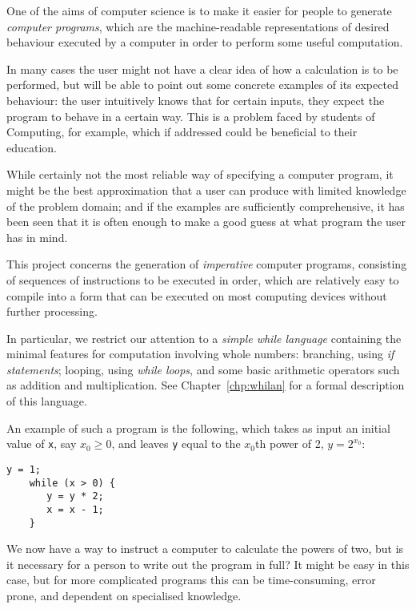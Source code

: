 \documentclass[a4paper,twoside,notitlepage]{report}
\begin{document}
One of the aims of computer science is to make it easier for people to 
generate \emph{computer programs}, which are the machine-readable 
representations of desired behaviour executed by a computer in order to 
perform some useful computation.

In many cases the user might not have a clear idea of how a calculation is 
to be performed, but will be able to point out some concrete examples of 
its expected behaviour: the user intuitively knows that for certain 
inputs, they expect the program to behave in a certain way. This is a 
problem faced by students of Computing, for example, which if addressed 
could be beneficial to their education.

While certainly not the most reliable way of specifying a computer 
program, it might be the best approximation that a user can produce with 
limited knowledge of the problem domain; and if the examples are 
sufficiently comprehensive, it has been seen that it is often enough to 
make a good guess at what program the user has in mind.

This project concerns the generation of \emph{imperative} computer 
programs, consisting of sequences of instructions to be executed in order, 
which are relatively easy to compile into a form that can be executed on 
most computing devices without further processing.

In particular, we restrict our attention to a \emph{simple while language} 
containing the minimal features for computation involving whole numbers: 
branching, using \emph{if statements}; looping, using \emph{while loops}, 
and some basic arithmetic operators such as addition and multiplication.
See Chapter~\ref{chp:whilan} for a formal description of this language.

An example of such a program is the following, which takes as input an initial 
value of \texttt{x}, say $x_0 \ge 0$, and leaves \texttt{y} equal to the 
$x_0$th power of 2, $y = 2^{x_0}$:
\begin{Verbatim}[samepage=true]
    y = 1;
    while (x > 0) {
       y = y * 2;
       x = x - 1;
    }
\end{Verbatim}

We now have a way to instruct a computer to calculate the powers of two, 
but is it necessary for a person to write out the program in full? It 
might be easy in this case, but for more complicated programs this can be 
time-consuming, error prone, and dependent on specialised knowledge.
\end{document}
